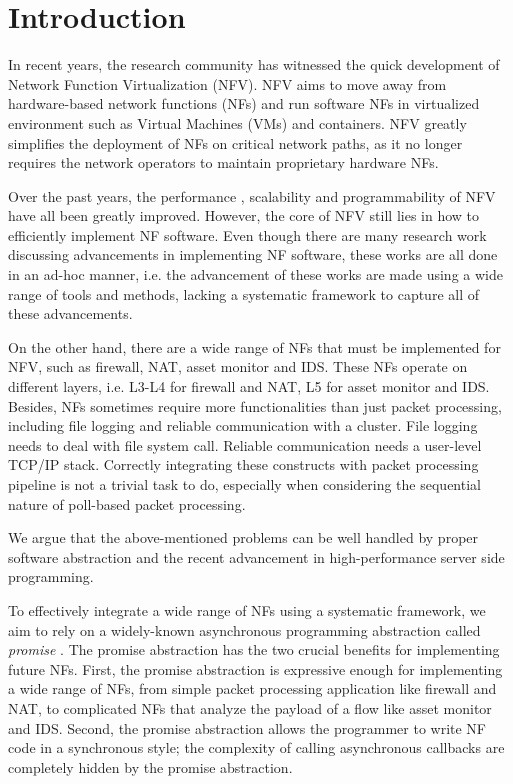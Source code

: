 \section{Introduction}

In recent years, the research community has witnessed the quick development of
Network Function Virtualization (NFV). NFV aims to move away from hardware-based
network functions (NFs) and run software NFs in virtualized environment such as
Virtual Machines (VMs) and containers. NFV greatly simplifies the deployment of
NFs on critical network paths, as it no longer requires the network operators to
maintain proprietary hardware NFs.

%
Over the past years, the performance \cite{dpdk, rizzo2012netmap,
  martins2014clickos, hwang2015netvm}, scalability \cite{palkar2015e2} and
programmability \cite{199352, 201546} of NFV have all been greatly
improved. However, the core of NFV still lies in how to efficiently implement NF
software. Even though there are many research work \cite{199352, 201546} discussing
advancements in implementing NF software, these works are all done in an ad-hoc
manner, i.e. the advancement of these works are made using a wide range of tools
and methods, lacking a systematic framework to capture all of these
advancements.

On the other hand, there are a wide range of NFs that must be implemented for
NFV, such as firewall, NAT, asset monitor and IDS. These NFs operate on
different layers, i.e. L3-L4 for firewall and NAT, L5 for asset monitor and
IDS. Besides, NFs sometimes require more functionalities than just packet
processing, including file logging and reliable communication with a
cluster. File logging needs to deal with file system call. Reliable
communication needs a user-level TCP/IP stack. Correctly integrating
these constructs with packet processing pipeline is not a trivial task to do,
especially when considering the sequential nature of poll-based packet
processing. 

We argue that the above-mentioned problems can be well handled by proper
software abstraction and the recent advancement in high-performance server side
programming. 

To effectively integrate a wide range of NFs using a systematic framework, we
aim to rely on a widely-known asynchronous programming abstraction called
\textit{promise} \cite{vouillon2008lwt}. The promise abstraction has the two
crucial benefits for implementing future NFs. First, the promise abstraction is
expressive enough for implementing a wide range of NFs, from simple packet
processing application like firewall and NAT, to complicated NFs that analyze
the payload of a flow like asset monitor and IDS. Second, the promise
abstraction allows the programmer to write NF code in a synchronous style; the
complexity of calling asynchronous callbacks are completely hidden by the
promise abstraction.

